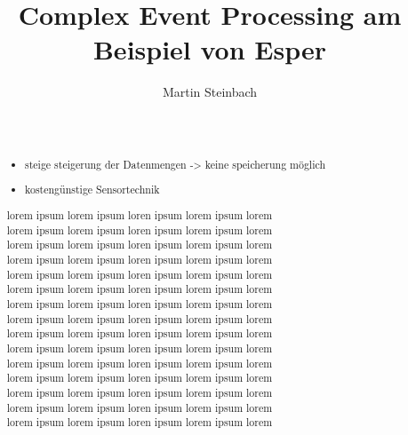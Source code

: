\documentclass{acm_proc_article-sp}
\begin{document}
\title{Complex Event Processing am Beispiel von Esper}
\author{
\alignauthor
Martin Steinbach\vspace{0.1cm}\\
       \\
       \\
       }


\maketitle

\begin{abstract}
    \vspace{0.1cm}
\begin{itemize}
    \item steige steigerung der Datenmengen -> keine speicherung möglich
    \item kostengünstige Sensortechnik 
\end{itemize}
lorem ipsum lorem ipsum loren ipsum lorem ipsum lorem \\
lorem ipsum lorem ipsum loren ipsum lorem ipsum lorem \\
lorem ipsum lorem ipsum loren ipsum lorem ipsum lorem \\
lorem ipsum lorem ipsum loren ipsum lorem ipsum lorem \\
lorem ipsum lorem ipsum loren ipsum lorem ipsum lorem \\
lorem ipsum lorem ipsum loren ipsum lorem ipsum lorem \\
lorem ipsum lorem ipsum loren ipsum lorem ipsum lorem \\
lorem ipsum lorem ipsum loren ipsum lorem ipsum lorem \\
lorem ipsum lorem ipsum loren ipsum lorem ipsum lorem \\
lorem ipsum lorem ipsum loren ipsum lorem ipsum lorem \\
lorem ipsum lorem ipsum loren ipsum lorem ipsum lorem \\
lorem ipsum lorem ipsum loren ipsum lorem ipsum lorem \\
lorem ipsum lorem ipsum loren ipsum lorem ipsum lorem \\
lorem ipsum lorem ipsum loren ipsum lorem ipsum lorem \\
lorem ipsum lorem ipsum loren ipsum lorem ipsum lorem \\
\end{abstract}
\end{document}

